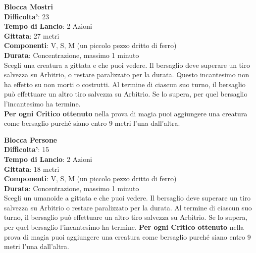 \begin{multicols}{2}
\medskip\textbf{Blocca Mostri}\\
\textbf{Difficolta'}: 23\\
\textbf{Tempo di Lancio}: 2 Azioni\\
\textbf{Gittata}: 27 metri\\
\textbf{Componenti}: V, S, M (un piccolo pezzo dritto di ferro)\\
\textbf{Durata}: Concentrazione, massimo 1 minuto\\
Scegli una creatura a gittata e che puoi vedere. Il bersaglio deve superare un tiro salvezza su Arbitrio, o restare paralizzato per la durata. Questo incantesimo non ha effetto su non morti o costrutti. Al termine di ciascun suo turno, il bersaglio può effettuare un altro tiro salvezza su Arbitrio. Se lo supera, per quel bersaglio l’incantesimo ha termine.\\
\textbf{Per ogni Critico ottenuto} nella prova di magia puoi aggiungere una creatura come bersaglio purché siano entro 9 metri l’una dall’altra.


\medskip\textbf{Blocca Persone}\\
\textbf{Difficolta'}: 15\\
\textbf{Tempo di Lancio}: 2 Azioni\\
\textbf{Gittata}: 18 metri\\
\textbf{Componenti}: V, S, M (un piccolo pezzo dritto di ferro)\\
\textbf{Durata}: Concentrazione, massimo 1 minuto\\
Scegli un umanoide a gittata e che puoi vedere. Il bersaglio deve superare un tiro salvezza su Arbitrio o restare paralizzato per la durata. Al termine di ciascun suo turno, il bersaglio può effettuare un altro tiro salvezza su Arbitrio. Se lo supera, per quel bersaglio l’incantesimo ha termine.
\textbf{Per ogni Critico ottenuto} nella prova di magia puoi aggiungere una creatura come bersaglio purché siano entro 9 metri l’una dall’altra.



\end{multicols}
